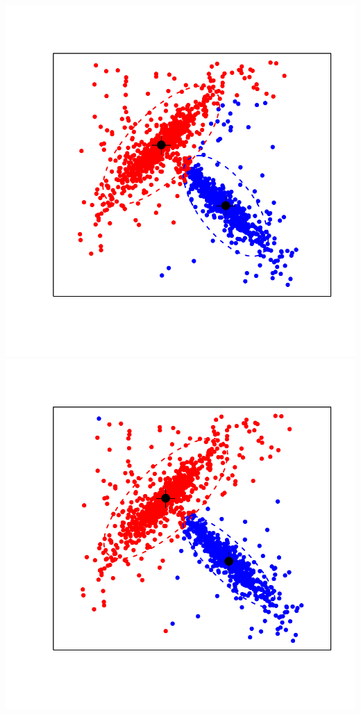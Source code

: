 \documentclass[landscape,footrule]{foils}
\begin{document}
\centerline{
\includegraphics[scale=0.6]{hard-gmm-3}\hspace*{-1.7cm}\includegraphics[scale=0.6]{hard-gmm-4}
\vspace*{-3.2cm}}
\end{document}
